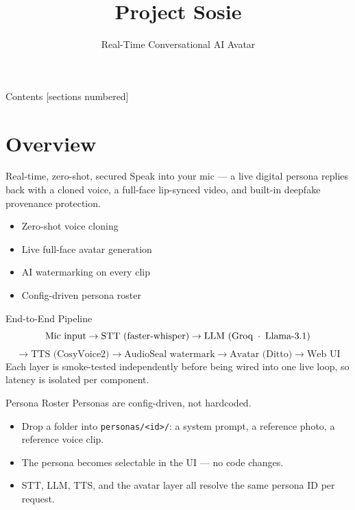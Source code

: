 \documentclass[11pt]{beamer}
\title{Project Sosie}
\subtitle{Real-Time Conversational AI Avatar}
\author{}
\date{}
\begin{document}
\maketitle

\begin{frame}{Contents}
  [sections numbered]
  \tableofcontents[hideallsubsections]
\end{frame}

\section{Overview}

\begin{frame}{Real-time, zero-shot, secured}
  Speak into your mic --- a live digital persona replies back with a cloned voice, a full-face lip-synced video, and built-in deepfake provenance protection.
  \begin{itemize}
    \item Zero-shot voice cloning
    \item Live full-face avatar generation
    \item AI watermarking on every clip
    \item Config-driven persona roster
  \end{itemize}
\end{frame}

\begin{frame}{End-to-End Pipeline}
  \[
  \text{Mic input}
  \rightarrow \text{STT (faster-whisper)}
  \rightarrow \text{LLM (Groq \,$\cdot$\, Llama-3.1)}
  \]
  \[
  \rightarrow \text{TTS (CosyVoice2)}
  \rightarrow \text{AudioSeal watermark}
  \rightarrow \text{Avatar (Ditto)}
  \rightarrow \text{Web UI}
  \]
  \vspace{1em}
  Each layer is smoke-tested independently before being wired into one live loop, so latency is isolated per component.
\end{frame}

\begin{frame}{Persona Roster}
  Personas are config-driven, not hardcoded.
  \begin{itemize}
    \item Drop a folder into \texttt{personas/<id>/}: a system prompt, a reference photo, a reference voice clip.
    \item The persona becomes selectable in the UI --- no code changes.
    \item STT, LLM, TTS, and the avatar layer all resolve the same persona ID per request.
  \end{itemize}
\end{frame}
\end{document}
